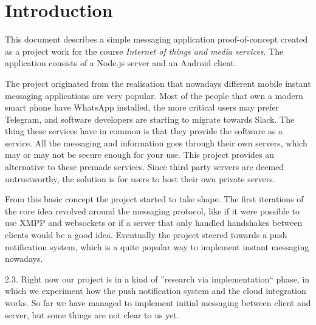 
\section{Introduction}
This document describes a simple messaging application proof-of-concept created as a project work for the course \emph{Internet of things and media services}. The application consists of a Node.js server and an Android client.

The project originated from the realisation that nowadays different mobile instant messaging applications are very popular. Most of the people that own a modern smart phone have WhatsApp installed, the more critical users may prefer Telegram, and software developers are starting to migrate towards Slack. The thing these services have in common is that they provide the software as a service. All the messaging and information goes through their own servers, which may or may not be secure enough for your use. This project provides an alternative to these premade services. Since third party servers are deemed untrustworthy, the solution is for users to host their own private servers.

From this basic concept the project started to take shape. The first iterations of the core idea revolved around the messaging protocol, like if it were possible to use XMPP and websockets or if a server that only handled handshakes between clients would be a good idea. Eventually the project steered towards a push notification system, which is a quite popular way to implement instant messaging nowadays.

{\color{red} 2.3. Right now our project is in a kind of ''research via implementation`` phase, in which we experiment how the push notification system and the cloud integration works. So far we have managed to implement initial messaging between client and server, but some things are not clear to us yet.}